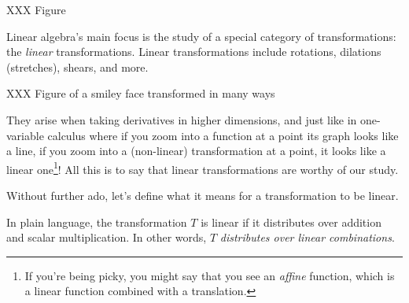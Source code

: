 XXX Figure


Linear algebra's main focus is the study of a special category of transformations: the \emph{linear} transformations.
Linear transformations include rotations, dilations (stretches), shears, and more.

XXX Figure of a smiley face transformed in many ways

They arise when taking derivatives in higher dimensions, and just like in one-variable calculus where if you zoom into
a function at a point its graph looks like a line, if you zoom into a (non-linear) transformation at a point, it looks like a linear
one\footnote{ If you're being picky, you might say that you see an \emph{affine} function, which is a linear function combined
with a translation.}! All this is to say that linear transformations are worthy of our study.

Without further ado, let's define what it means for a transformation to be linear.


In plain language, the transformation $T$ is linear if it distributes over addition and scalar multiplication.
In other words, $T$ \emph{distributes over linear combinations}.

